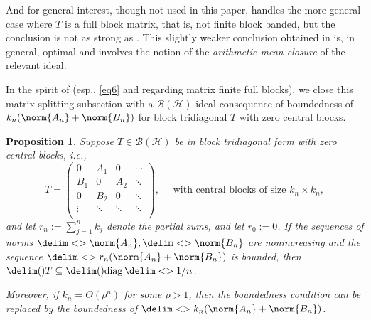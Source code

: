 \documentclass[10pt,reqno]{amsart}
\newtheorem{proposition}[theorem]{Proposition}
\theoremstyle{remark}
\newcommand{\BH}{\mathcal{B}(\Hil)}
\newcommand{\Hil}{\mathcal{H}}
\DeclareMathOperator{\diag}{diag}
\newcommand{\seq}{\delim<>}
\newcommand{\ideal}{\delim()}
\numberwithin{equation}{section}
\begin{document}
And for general interest, though not used in this paper, \cite[Theorem~9]{LW-2021-OM} handles the more general case where $T$ is a full block matrix, that is, not finite block banded, but the conclusion is not as strong as .
This slightly weaker conclusion obtained in \cite{LW-2021-OM} is, in general, optimal and involves the notion of the \emph{arithmetic mean closure} of the relevant ideal.

In the spirit of  (esp., \eqref{eq6} and  regarding matrix finite full blocks), we close this matrix splitting subsection with a $\BH$-ideal consequence of boundedness of $k_n(\norm{A_n}+\norm{B_n})$ for block tridiagonal $T$ with zero central blocks.

\begin{proposition}
  \label{prop:inclusion-diag-omega}
  Suppose $T \in \BH$ be in block tridiagonal form with zero central blocks, i.e.,
  \begin{equation*}
    \label{eq:zero-block-diag}
    T =
    \begin{pmatrix}
      0   & A_1 & 0   & \cdots          \\
      B_1 & 0   & A_2 & \ddots           \\
      0   & B_2 & 0   &\ddots            \\
      \vdots & \ddots & \ddots  &\ddots \\
    \end{pmatrix},
    \quad \text{ with central blocks of size } k_n \times k_n,
  \end{equation*}
  and let $r_n := \sum_{j=1}^n k_j$ denote the partial sums, and let $r_0 := 0$.
  If the sequences of norms $\seq{\norm{A_n}}, \seq{\norm{B_n}}$ are nonincreasing and the sequence $\seq{r_n (\norm{A_n} + \norm{B_n})}$ is bounded, then $\ideal{T} \subseteq \ideal{\diag\seq{1/n}}$.

  Moreover, if $k_n = \Theta(\rho^n)$ for some $\rho > 1$, then the boundedness condition can be replaced by the boundedness of $\seq{k_n(\norm{A_n} + \norm{B_n})}$.
\end{proposition}
\end{document}
